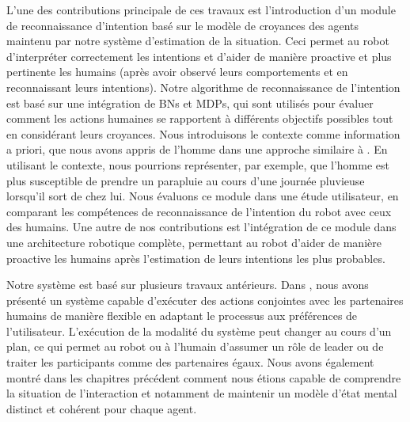 \documentclass[a4paper,11pt,twoside]{StyleThese}
\begin{document}
L'une des contributions principale de ces travaux est l'introduction d'un module de reconnaissance d'intention basé sur le modèle de croyances des agents maintenu par notre système d'estimation de la situation. Ceci permet au robot d'interpréter correctement les intentions et d'aider de manière proactive et plus pertinente les humains (après avoir observé leurs comportements et en reconnaissant leurs intentions).
Notre algorithme de reconnaissance de l'intention est basé sur une intégration de BNs et MDPs, qui sont utilisés pour évaluer comment les actions humaines se rapportent à différents objectifs possibles tout en considérant leurs croyances. Nous introduisons le contexte comme information a priori, que nous avons appris de l'homme dans une approche similaire à \cite{Liu2014}. En utilisant le contexte, nous pourrions représenter, par exemple, que l'homme est plus susceptible de prendre un parapluie au cours d'une journée pluvieuse lorsqu'il sort de chez lui. Nous évaluons ce module dans une étude utilisateur, en comparant les compétences de reconnaissance de l'intention du robot avec ceux des humains. Une autre de nos contributions est l'intégration de ce module dans une architecture robotique complète, permettant au robot d'aider de manière proactive les humains après l'estimation de leurs intentions les plus probables.

Notre système est basé sur plusieurs travaux antérieurs. Dans \cite{fioreiser2014}, nous avons présenté un système capable d'exécuter des actions conjointes avec les partenaires humains de manière flexible en adaptant le processus aux préférences de l'utilisateur. L'exécution de la modalité du système peut changer au cours d'un plan, ce qui permet au robot ou à l'humain d'assumer un rôle de leader ou de traiter les participants comme des partenaires égaux. Nous avons également montré dans les chapitres précédent comment nous étions capable de comprendre la situation de l'interaction et notamment de maintenir un modèle d'état mental distinct et cohérent pour chaque agent.

\end{document}
